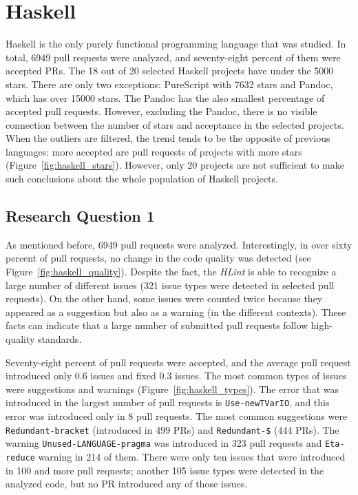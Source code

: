 \documentclass[digital,oneside,oldtable,nolof,nolot,nocover]{fithesis4}
\begin{document}
\section{Haskell}
\label{sec:org99ef030}
Haskell is the only purely functional programming language that was studied.
In total, 6949 pull requests were analyzed, and seventy-eight percent of them were accepted PRs.
The 18 out of 20 selected Haskell projects have under the 5000 stars. There
are only two exceptions: PureScript with 7632 stars and Pandoc, which has over
15000 stars. The Pandoc has the also smallest percentage of accepted pull
requests.  However, excluding the Pandoc, there is no visible connection
between the number of stars and acceptance in the selected projects. When the
outliers are filtered, the trend tends to be the opposite of previous languages:
more accepted are pull requests of projects with more stars (Figure~\ref{fig:haskell_stars}).
However, only 20 projects are not sufficient to make such conclusions about the whole
population of Haskell projects.
\subsection{Research Question 1}
\label{sec:org1d4b41e}
As mentioned before, 6949 pull requests were analyzed. Interestingly, in over sixty
percent of pull requests, no change in the code quality was detected (see Figure~\ref{fig:haskell_quality}).
Despite the fact, the \emph{HLint} is able to recognize a large number of different issues (321 issue
types were detected in selected pull requests). On the other hand, some issues
were counted twice because they appeared as a suggestion but also as a warning (in the different contexts).
These facts can indicate that a large
number of submitted pull requests follow high-quality standards.

Seventy-eight percent of pull requests were accepted, and the average pull request introduced
only 0.6 issues and fixed 0.3 issues. The most common types of issues were suggestions
and warnings (Figure~\ref{fig:haskell_types}). The error that was
introduced in the largest number of pull requests is
\texttt{Use-newTVarIO}, and this error was introduced only in 8 pull requests. The most common
suggestions were \texttt{Redundant-bracket} (introduced in 499 PRs) and \texttt{Redundant-\$} (444 PRs).
The warning \texttt{Unused-LANGUAGE-pragma} was introduced in 323 pull requests and \texttt{Eta-reduce}
warning in 214 of them. There were only ten issues that were introduced in 100 and more
pull requests; another 105 issue types were detected in the analyzed code, but no PR introduced
any of those issues.
\end{document}
